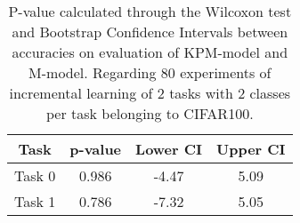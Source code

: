 \begin{table}[H]
\centering
\begin{tabular}{cccc}
\toprule
Task & p-value & Lower CI & Upper CI \\
\midrule
Task 0 & 0.986 &-4.47 & 5.09 \\
Task 1 & 0.786 &-7.32 & 5.05 \\
\bottomrule
\end{tabular}
\caption{P-value calculated through the Wilcoxon test and Bootstrap Confidence Intervals between accuracies on evaluation of KPM-model and M-model. Regarding 80 experiments of incremental learning of 2 tasks with 2 classes per task belonging to CIFAR100.}
\end{table}
